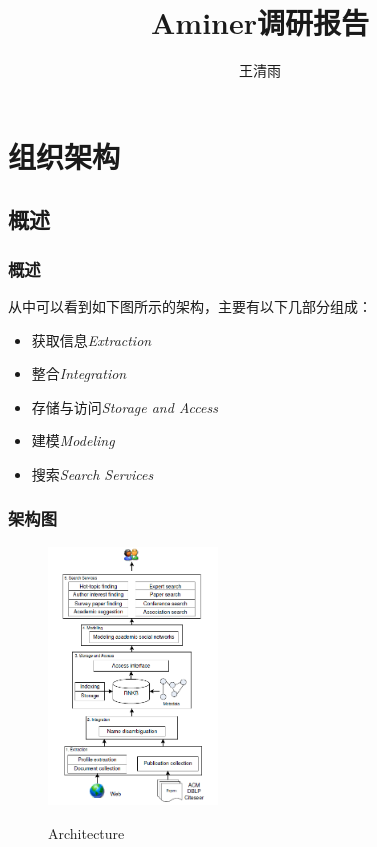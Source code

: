 \documentclass[UTF8]{ctexbeamer}
\title{Aminer调研报告}
\author{王清雨}
\begin{document}
\maketitle
\frame{
    \tableofcontents
}




\section{组织架构}
\frame{\sectionpage}

\subsection{概述}
\begin{frame}
    \frametitle{概述}


    从\cite{tang2008arnetminer}中可以看到如下图所示的架构，主要有以下几部分组成：
    \begin{itemize}
        \item {\heiti 获取信息}\textit{Extraction}
        \item {\heiti 整合}\textit{Integration}
        \item {\heiti 存储与访问}\textit{Storage and Access}
        \item {\heiti 建模}\textit{Modeling}
        \item {\heiti 搜索}\textit{Search Services}
    \end{itemize}
\end{frame}

\begin{frame}
    \frametitle{架构图}

    \begin{figure}[h]
        \caption{Architecture}
        \centering
        \includegraphics[width=0.4\textwidth]{assets/figures/arch.PNG}
        \label{fig:arch}
    \end{figure}

\end{frame}
\end{document}

